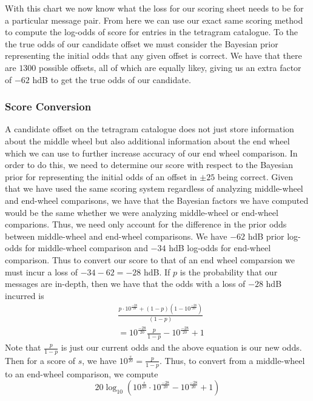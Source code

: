 \noindent With this chart we now know what the loss for our scoring sheet needs to be for a particular message pair. From here we can use our exact same scoring method to compute the log-odds of score for entries in the tetragram catalogue. To the the true odds of our candidate offset we must consider the Bayesian prior representing the initial odds that any given offset is correct. We have that there are $1300$ possible offsets, all of which are equally likey, giving us an extra factor of $-62$ hdB to get the true odds of our candidate.
\subsubsection{Score Conversion} A candidate offset on the tetragram catalogue does not just store information about the middle wheel but also additional information about the end wheel which we can use to further increase accuracy of our end wheel comparison. In order to do this, we need to determine our score with respect to the Bayesian prior for representing the initial odds of an offset in $\pm25$ being correct. Given that we have used the same scoring system regardless of analyzing middle-wheel and end-wheel comparisons, we have that the Bayesian factors we have computed would be the same whether we were analyzing middle-wheel or end-wheel comparions. Thus, we need only account for the difference in the prior odds between middle-wheel and end-wheel comparisons. We have $-62$ hdB prior log-odds for middle-wheel comparison and $-34$ hdB log-odds for end-wheel comparison. Thus to convert our score to that of an end wheel comparsion we must incur a loss of $-34-62 = -28$ hdB. If $p$ is the probability that our messages are in-depth, then we have that the odds with a loss of $-28$ hdB incurred is
\begin{align*}
	 & \frac{p\cdot10^{\frac{-28}{20}} + (1-p)(1-10^{\frac{-28}{20}})}{(1-p)} \\
	 & = 10^{\frac{-28}{20}}\frac{p}{1-p}-10^{\frac{-28}{20}} + 1
\end{align*}
Note that $\frac{p}{1-p}$ is just our current odds and the above equation is our new odds. Then for a score of $s$, we have $10^\frac{s}{20} = \frac{p}{1-p}$. Thus, to convert from a middle-wheel to an end-wheel comparison, we compute
\[
	20\log_{10}(10^\frac{s}{20}\cdot10^{\frac{-28}{20}} -10^{\frac{-28}{20}} + 1)
\]


